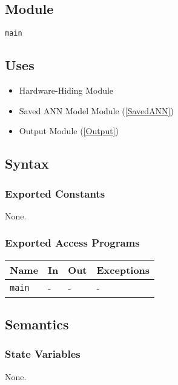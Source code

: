 \documentclass[12pt, titlepage]{article}
\def\code#1{\texttt{#1}}
\begin{document}


\subsection{Module}
\code{main} 


\subsection{Uses}
\begin{itemize}
  \item Hardware-Hiding Module  
  \item Saved ANN Model Module (\ref{SavedANN})
  \item Output Module (\ref{Output})
\end{itemize}


\subsection{Syntax}

\subsubsection{Exported Constants}
None.

\subsubsection{Exported Access Programs}

\begin{center}
\begin{tabular}{p{2cm} p{4cm} p{4cm} p{2cm}}
\hline
\textbf{Name} & \textbf{In} & \textbf{Out} & \textbf{Exceptions} \\
\hline
\code{main} & - & - & - \\
\hline
\end{tabular}
\end{center}

\subsection{Semantics}

\subsubsection{State Variables}
None.
\end{document}
